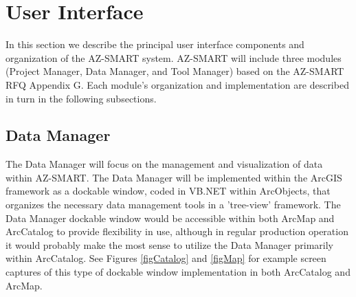 \section{User Interface}

In this section we describe the principal user interface components
and organization of the AZ-SMART system.  AZ-SMART will include
three modules (Project Manager, Data Manager, and Tool Manager)
based on the AZ-SMART RFQ Appendix G. Each module's organization and
implementation are described in turn in the following subsections.



\subsection{Data Manager}

The Data Manager will focus on the management and visualization of
data within AZ-SMART.  The Data Manager will be implemented within
the ArcGIS framework as a dockable window, coded in VB.NET within
ArcObjects, that organizes the necessary data management tools in a
'tree-view' framework.  The Data Manager dockable window would be
accessible within both ArcMap and ArcCatalog to provide flexibility
in use, although in regular production operation it would probably
make the most sense to utilize the Data Manager primarily within
ArcCatalog.  See Figures \ref{figCatalog} and \ref{figMap} for
example screen captures of this type of dockable window
implementation in both ArcCatalog and ArcMap.


